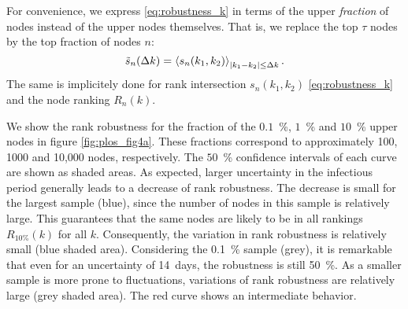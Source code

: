 For convenience, we express \eqref{eq:robustness_k} in terms of the upper \emph{fraction} of nodes instead of the upper nodes themselves.
That is, we replace the top $\tau $ nodes by the top fraction of nodes $n$:
\begin{equation}\label{eq:rank_robustness}
\tilde{s}_n (\Delta k)=\left< s_n (k_1,k_2) \right>_{\left| k_1-k_2 \right|\leq \Delta k} .
\end{equation}
The same is implicitely done for rank intersection $s_n(k_1,k_2)$ \eqref{eq:robustness_k} and the node ranking $R_n(k)$.

We show the rank robustness for the fraction of the $0.1$~\%, $1$~\% and $10$~\% upper nodes in figure \ref{fig:plos_fig4a}.
These fractions correspond to approximately 100, 1000 and 10,000 nodes, respectively.
The $50$~\% confidence intervals of each curve are shown as shaded areas.
As expected, larger uncertainty in the infectious period generally leads to a decrease of rank robustness.
The decrease is small for the largest sample (blue), since the number of nodes in this sample is relatively large.
This guarantees that the same nodes are likely to be in all rankings $R_{10\%}(k)$ for all $k$.  
Consequently, the variation in rank robustness is relatively small (blue shaded area).
Considering the 0.1~\% sample (grey), it is remarkable that even for an uncertainty of 14~days, the robustness is still 50~\%.
As a smaller sample is more prone to fluctuations, variations of rank robustness are relatively large (grey shaded area).
The red curve shows an intermediate behavior.

